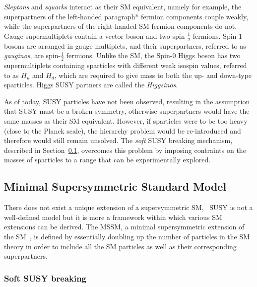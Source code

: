 		\textit{Sleptons} and \textit{squarks} interact as their \ac{SM} equivalent, namely for example, the superpartners of the left-handed paragraph* fermion components couple weakly, while the superpartners of the right-handed \ac{SM} fermion components do not. Gauge supermultiplets contain a vector boson and two spin-$\frac{1}{2}$ fermions. Spin-1 bosons are arranged in gauge multiplets, and their superpartners, referred to as \textit{gauginos}, are spin-$\frac{1}{2}$ fermions. Unlike the \ac{SM}, the Spin-0 Higgs boson has two supermultiplets containing sparticles with different weak isospin values, referred to as $H_u$ and $H_d$, which are required to give mass to both the up- and down-type sparticles. Higgs \ac{SUSY} partners are called the \textit{Higgsinos}.

		As of today, \ac{SUSY} particles have not been observed, resulting in the assumption that \ac{SUSY} must be a broken symmetry, otherwise superpartners would have the same masses as their \ac{SM} equivalent. However, if sparticles were to be too heavy (close to the Planck scale), the hierarchy problem would be re-introduced and therefore would still remain unsolved. The \emph{soft} \ac{SUSY} breaking mechanism, described in Section~\ref{sec:MSSM}, overcomes this problem by imposing contraints on the masses of sparticles to a range that can be experimentally explored. 		


		\subsection{Minimal Supersymmetric Standard Model}
		\label{sec:MSSM}
			
			There does not exist a unique extension of a supersymmetric \ac{SM}, \ie\ \ac{SUSY} is not a well-defined model but it is more a framework within which various \ac{SM} extensions can be derived.
			The \ac{MSSM}, a minimal supersymmetric extension of the \ac{SM}~\cite{Jegerlehner:2013nna}, is defined by essentially doubling up the number of particles in the \ac{SM} theory in order to include all the \ac{SM} particles as well as their corresponding superpartners.

			\subsubsection*{Soft SUSY breaking}
				
